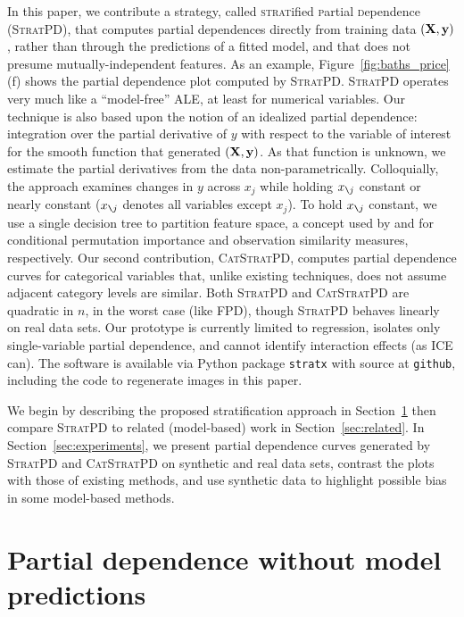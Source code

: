 \documentclass[smallextended]{svjour3}       %
\newcommand{\secref}[1]{Section~\ref{#1}}
\newcommand{\figref}[1]{Figure~\ref{#1}}
\newcommand{\spd}{\fontfamily{cmr}\textsc{\small StratPD}}
\newcommand{\cspd}{\fontfamily{cmr}\textsc{\small CatStratPD}}
\newcommand{\xnj}{$x_{\texttt{\char`\\} j}$}
\begin{document}
In this paper, we contribute a strategy, called {\textsc{strat}ified \textsc{p}artial \textsc{d}ependence} (\spd{}), that computes partial dependences directly from training data $({\bf X}, {\bf y})$, rather than through the predictions of a fitted model, and that does not presume mutually-independent features. As an example, \figref{fig:baths_price}(f) shows the partial dependence plot computed by \spd.  \spd{} operates very much like a ``model-free'' ALE, at least for numerical variables.  Our technique is also based upon the notion of an idealized partial dependence:  integration over the partial derivative of $y$ with respect to the variable of interest for the smooth function that generated $({\bf X}, {\bf y})$. As that function is unknown, we estimate the partial derivatives from the data non-parametrically.  Colloquially, the approach examines changes in $y$ across $x_j$ while holding \xnj{} constant or nearly constant (\xnj{} denotes all variables except $x_j$).  To hold \xnj{} constant, we use a single decision tree to partition feature space, a concept used by \citep{rfimp} and \citep{RFunsup} for conditional permutation importance and observation similarity measures, respectively.  Our second contribution, \cspd{}, computes partial dependence curves for categorical variables that, unlike existing techniques, does not assume adjacent category levels are similar. Both \spd{} and \cspd{} are quadratic in $n$, in the worst case (like FPD), though \spd{} behaves linearly on real data sets.  Our prototype is currently limited to regression, isolates only single-variable partial dependence, and cannot identify interaction effects (as ICE can).  The software is available via Python package {\tt stratx} with source at {\tt github}, including the code to regenerate images in this paper.

We begin by describing the proposed stratification approach in \secref{sec:stratpd} then compare \spd{} to related (model-based) work in \secref{sec:related}. In \secref{sec:experiments}, we present partial dependence curves generated by \spd{} and \cspd{} on synthetic and real data sets, contrast the plots with those of existing methods, and use synthetic data to highlight possible bias in some model-based methods.

\section{Partial dependence without model predictions}\label{sec:stratpd}
\end{document}
